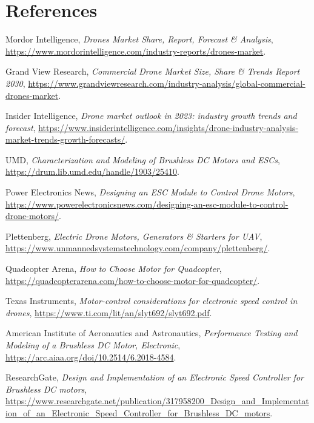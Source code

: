 \documentclass[12pt]{article}
\begin{document}
	\section{References}
	\begin{thebibliography}{9}
		Mordor Intelligence,
		\textit{Drones Market Share, Report, Forecast \& Analysis},
		\url{https://www.mordorintelligence.com/industry-reports/drones-market}.
		
		Grand View Research,
		\textit{Commercial Drone Market Size, Share \& Trends Report 2030},
		\url{https://www.grandviewresearch.com/industry-analysis/global-commercial-drones-market}.
		
		Insider Intelligence,
		\textit{Drone market outlook in 2023: industry growth trends and forecast},
		\url{https://www.insiderintelligence.com/insights/drone-industry-analysis-market-trends-growth-forecasts/}.
		
		UMD,
		\textit{Characterization and Modeling of Brushless DC Motors and ESCs},
		\url{https://drum.lib.umd.edu/handle/1903/25410}.
		
		Power Electronics News,
		\textit{Designing an ESC Module to Control Drone Motors},
		\url{https://www.powerelectronicsnews.com/designing-an-esc-module-to-control-drone-motors/}.
		
		Plettenberg,
		\textit{Electric Drone Motors, Generators \& Starters for UAV},
		\url{https://www.unmannedsystemstechnology.com/company/plettenberg/}.
		
		Quadcopter Arena,
		\textit{How to Choose Motor for Quadcopter},
		\url{https://quadcopterarena.com/how-to-choose-motor-for-quadcopter/}.
		
		Texas Instruments,
		\textit{Motor-control considerations for electronic speed control in drones},
		\url{https://www.ti.com/lit/an/slyt692/slyt692.pdf}.
		
		American Institute of Aeronautics and Astronautics,
		\textit{Performance Testing and Modeling of a Brushless DC Motor, Electronic},
		\url{https://arc.aiaa.org/doi/10.2514/6.2018-4584}.
		
		ResearchGate,
		\textit{Design and Implementation of an Electronic Speed Controller for Brushless DC motors},
		\url{https://www.researchgate.net/publication/317958200_Design_and_Implementation_of_an_Electronic_Speed_Controller_for_Brushless_DC_motors}.
		

\end{thebibliography}
\end{document}
